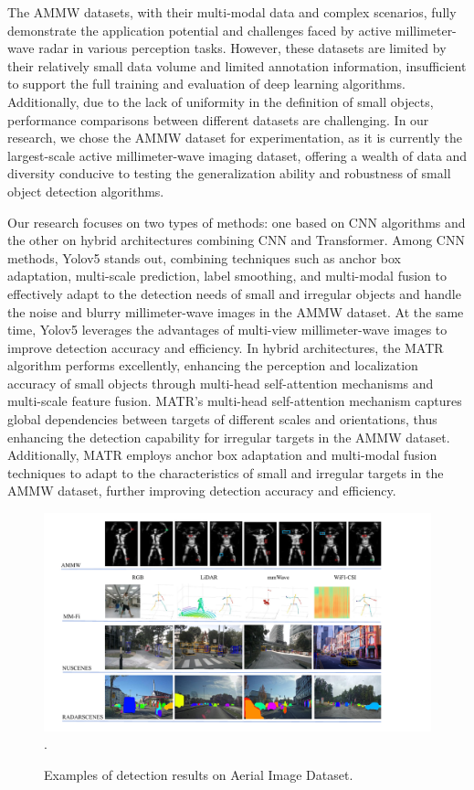 \documentclass[journal]{IEEEtran}
\begin{document}
The AMMW datasets, with their multi-modal data and complex scenarios, fully demonstrate the application potential and challenges faced by active millimeter-wave radar in various perception tasks. However, these datasets are limited by their relatively small data volume and limited annotation information, insufficient to support the full training and evaluation of deep learning algorithms. Additionally, due to the lack of uniformity in the definition of small objects, performance comparisons between different datasets are challenging. In our research, we chose the AMMW dataset for experimentation, as it is currently the largest-scale active millimeter-wave imaging dataset, offering a wealth of data and diversity conducive to testing the generalization ability and robustness of small object detection algorithms.

Our research focuses on two types of methods: one based on CNN algorithms and the other on hybrid architectures combining CNN and Transformer. Among CNN methods, Yolov5 stands out, combining techniques such as anchor box adaptation, multi-scale prediction, label smoothing, and multi-modal fusion to effectively adapt to the detection needs of small and irregular objects and handle the noise and blurry millimeter-wave images in the AMMW dataset. At the same time, Yolov5 leverages the advantages of multi-view millimeter-wave images to improve detection accuracy and efficiency. In hybrid architectures, the MATR algorithm performs excellently, enhancing the perception and localization accuracy of small objects through multi-head self-attention mechanisms and multi-scale feature fusion. MATR’s multi-head self-attention mechanism captures global dependencies between targets of different scales and orientations, thus enhancing the detection capability for irregular targets in the AMMW dataset. Additionally, MATR employs anchor box adaptation and multi-modal fusion techniques to adapt to the characteristics of small and irregular targets in the AMMW dataset, further improving detection accuracy and efficiency.

\begin{figure}[htbp]
	\centering
	\setlength{\abovecaptionskip}{-0.6cm}
	\includegraphics[width=\textwidth]{fig 14}
	\DeclareGraphicsExtensions.
	\caption{Examples of detection results on Aerial Image Dataset.}
	\label{fig 1}
\end{figure}
\end{document}
